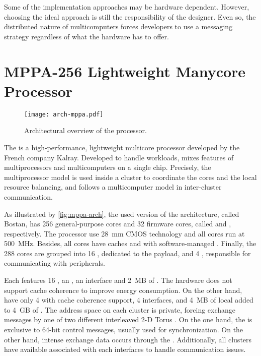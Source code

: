 				Some of the implementation approaches may be hardware dependent.
				However, choosing the ideal approach is still the responsibility of the \os designer.
				Even so, the distributed nature of multicomputers forces developers to
				use a messaging strategy regardless of what the hardware has to offer.

\section{MPPA-256 Lightweight Manycore Processor}
\label{sec.mppa}

	\begin{figure}[t]
		\centering%
		\caption{Architectural overview of the \mppa processor.}%
		\label{fig:mppa-arch}%
		\texttt{[image: arch-mppa.pdf]}%
	\end{figure}

	The \mppa is a high-performance, lightweight multicore processor
	developed by the French company Kalray.
	Developed to handle \mimd workloads, \mppa mixes features of
	multiprocessors and multicomputers on a single chip.
	Precisely, the multiprocessor model is used inside a cluster
	to coordinate the cores and the local resource balancing, and
	follows a multicomputer model in inter-cluster communication.

	As illustrated by \autoref{fig:mppa-arch},
	the used version of
	the architecture, called Bostan, has 256 general-purpose cores and
	32 firmware cores, called \pes and \rms, respectively.
	The processor use 28~mm CMOS technology and all cores run at 500~MHz.
	Besides, all cores have caches and \mmus with software-managed \tlbs.
	Finally, the 288 cores are grouped into 16 \cclusters, dedicated to
	the payload, and 4 \ioclusters, responsible for communicating with peripherals.

	Each \ccluster features 16 \pes, an \rm, an \noc interface and 2~MB of \sram.
	The hardware does not support cache coherence to improve energy consumption.
	On the other hand, \ioclusters have only 4 \rms with cache coherence support,
	4 \noc interfaces, and 4~MB of local \sram added to 4~GB of \dram.
	The address space on each cluster is private, forcing exchange messages
	by one of two different interleaved 2-D Torus \nocs.
	On the one hand, the \cnoc is exclusive to 64-bit control messages,
	usually used for synchronization.
	On the other hand, intense exchange data occurs through the \dnoc.
	Additionally, all clusters have available \dmas associated with each
	\noc interfaces to handle communication issues.

